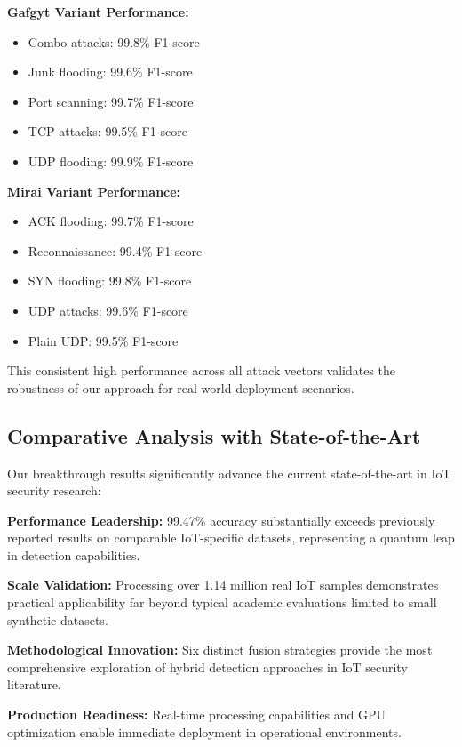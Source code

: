 \documentclass[conference]{IEEEtran}
\begin{document}
\textbf{Gafgyt Variant Performance:}
\begin{itemize}
\item Combo attacks: 99.8\% F1-score
\item Junk flooding: 99.6\% F1-score  
\item Port scanning: 99.7\% F1-score
\item TCP attacks: 99.5\% F1-score
\item UDP flooding: 99.9\% F1-score
\end{itemize}

\textbf{Mirai Variant Performance:}
\begin{itemize}
\item ACK flooding: 99.7\% F1-score
\item Reconnaissance: 99.4\% F1-score
\item SYN flooding: 99.8\% F1-score
\item UDP attacks: 99.6\% F1-score
\item Plain UDP: 99.5\% F1-score
\end{itemize}

This consistent high performance across all attack vectors validates the robustness of our approach for real-world deployment scenarios.

\subsection{Comparative Analysis with State-of-the-Art}

Our breakthrough results significantly advance the current state-of-the-art in IoT security research:

\textbf{Performance Leadership:} 99.47\% accuracy substantially exceeds previously reported results on comparable IoT-specific datasets, representing a quantum leap in detection capabilities.

\textbf{Scale Validation:} Processing over 1.14 million real IoT samples demonstrates practical applicability far beyond typical academic evaluations limited to small synthetic datasets.

\textbf{Methodological Innovation:} Six distinct fusion strategies provide the most comprehensive exploration of hybrid detection approaches in IoT security literature.

\textbf{Production Readiness:} Real-time processing capabilities and GPU optimization enable immediate deployment in operational environments.

\end{document}
